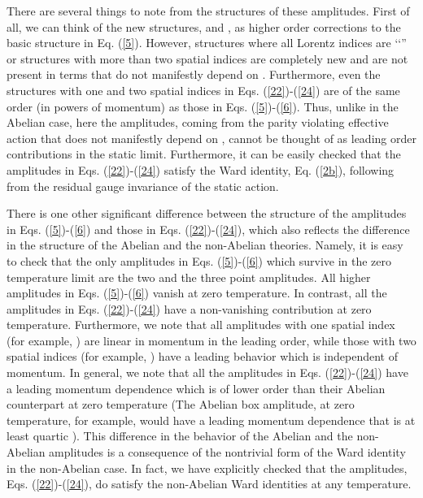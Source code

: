 \documentclass[a4paper,12pt]{article}
\begin{document}
There are several things to note from the structures of these
amplitudes. First of all, we can think of the new structures,
\coordHE{} and \coordHE{}, as higher
order  corrections to
the basic structure in Eq. (\ref{5}). However, structures where all
Lorentz indices are \lq\lq{}\coordHE{}'' or structures with more than two
spatial indices are completely new and are not present in terms that
do not manifestly depend on \coordHE{}. Furthermore, even the
structures with  one
and two spatial indices in Eqs. (\ref{22})-(\ref{24}) are of the same
order (in powers of momentum) as those in
Eqs. (\ref{5})-(\ref{6}). Thus, unlike in the Abelian case, here the
amplitudes, coming from the parity violating effective action that
does not manifestly depend on \coordHE{}, cannot be thought of as
leading  order
contributions in the static limit. Furthermore, it can be easily
checked that the amplitudes in Eqs. (\ref{22})-(\ref{24}) satisfy the
Ward identity, Eq. (\ref{2b}), following from the residual gauge
invariance of the static action.

There is one other significant difference between the structure of the
amplitudes in Eqs. (\ref{5})-(\ref{6}) and those in
Eqs. (\ref{22})-(\ref{24}), which also reflects the difference in the
structure of the Abelian and the non-Abelian theories. Namely, it is
easy to check that the only amplitudes in Eqs. (\ref{5})-(\ref{6}) which
survive in the zero temperature limit are the two and the three point
amplitudes. All higher amplitudes in Eqs. (\ref{5})-(\ref{6}) vanish at
zero temperature. In contrast, all the amplitudes in
Eqs. (\ref{22})-(\ref{24}) have a non-vanishing contribution at zero
temperature. Furthermore, we note that all amplitudes with one spatial
index (for example, \coordHE{}) are linear in
momentum in the leading order, while those with two spatial indices
(for example, \coordHE{}) have a leading
behavior which is independent of momentum. In general, we note that
all the amplitudes in Eqs. (\ref{22})-(\ref{24}) have a leading momentum
dependence which is of lower order than their Abelian counterpart at
zero temperature \cite{coleman:1985zi}
(The Abelian box amplitude, at zero temperature, for
example, would have a leading momentum dependence that is at least
quartic \cite{Brandt:2000dd}). 
This difference in the behavior of the Abelian and the
non-Abelian amplitudes is a consequence of the nontrivial form of the
Ward identity in the non-Abelian case. In fact, we have explicitly checked
that the amplitudes, Eqs. (\ref{22})-(\ref{24}), do satisfy the
non-Abelian Ward identities at any temperature.
\end{document}

